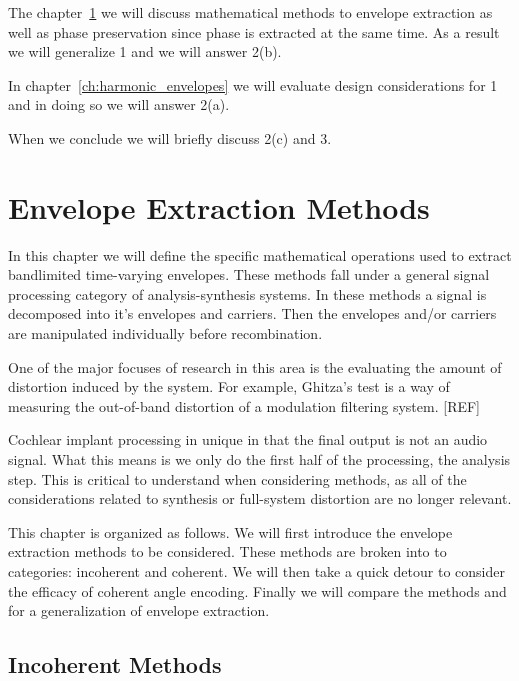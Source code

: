 \documentclass [11pt, proquest,oneside] {ganter_thesis}[2015/03/03]
\begin{document}
The chapter~\ref{ch:envelope_extraction_chapter} we will discuss mathematical methods to envelope extraction as well as phase preservation since phase is extracted at the same time.  As a result we will generalize 1 and we will answer 2(b).

In chapter~\ref{ch:harmonic_envelopes} we will evaluate design considerations for 1 and in doing so we will answer 2(a).

When we conclude we will briefly discuss 2(c) and 3.


\chapter{Envelope Extraction Methods}\label{ch:envelope_extraction_chapter}

In this chapter we will define the specific mathematical operations used to extract bandlimited time-varying envelopes.  These methods fall under a general signal processing category of analysis-synthesis systems.  In these methods a signal is decomposed into it's envelopes and carriers.  Then the envelopes and/or carriers are manipulated individually before recombination. 

One of the major focuses of research in this area is the evaluating the amount of distortion induced by the system.  For example, Ghitza's test is a way of measuring the out-of-band distortion of a modulation filtering system. [REF] %

Cochlear implant processing in unique in that the final output is not an audio signal.  What this means is we only do the first half of the processing, the analysis step.  This is critical to understand when considering methods, as all of the considerations related to synthesis or full-system distortion are no longer relevant.

This chapter is organized as follows.  We will first introduce the envelope extraction methods to be considered.  These methods are broken into to categories: incoherent and coherent.  We will then take a quick detour to consider the efficacy of coherent angle encoding.  Finally we will compare the methods and for a generalization of envelope extraction.

\section{Incoherent Methods}
\end{document}
